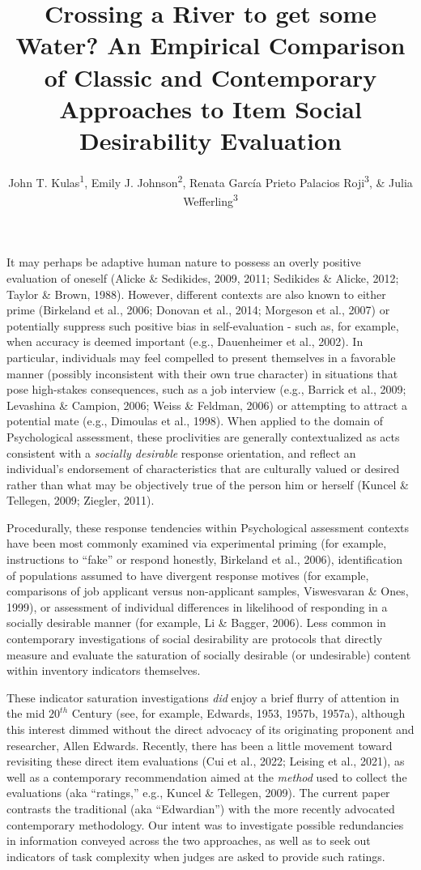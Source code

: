 \documentclass[
  ,jou]{apa6}
\title{Crossing a River to get some Water? An Empirical Comparison of Classic and Contemporary Approaches to Item Social Desirability Evaluation}
\author{John T. Kulas\textsuperscript{1}, Emily J. Johnson\textsuperscript{2}, Renata García Prieto Palacios Roji\textsuperscript{3}, \& Julia Wefferling\textsuperscript{3}}
\date{}
\affiliation{\vspace{0.5cm}\textsuperscript{1} eRg\\\textsuperscript{2} St.~Cloud State University\\\textsuperscript{3} Montclair State University}
\begin{document}
\maketitle

It may perhaps be adaptive human nature to possess an overly positive evaluation of oneself (Alicke \& Sedikides, 2009, 2011; Sedikides \& Alicke, 2012; Taylor \& Brown, 1988). However, different contexts are also known to either prime (Birkeland et al., 2006; Donovan et al., 2014; Morgeson et al., 2007) or potentially suppress such positive bias in self-evaluation - such as, for example, when accuracy is deemed important (e.g., Dauenheimer et al., 2002). In particular, individuals may feel compelled to present themselves in a favorable manner (possibly inconsistent with their own true character) in situations that pose high-stakes consequences, such as a job interview (e.g., Barrick et al., 2009; Levashina \& Campion, 2006; Weiss \& Feldman, 2006) or attempting to attract a potential mate (e.g., Dimoulas et al., 1998). When applied to the domain of Psychological assessment, these proclivities are generally contextualized as acts consistent with a \emph{socially desirable} response orientation, and reflect an individual's endorsement of characteristics that are culturally valued or desired rather than what may be objectively true of the person him or herself (Kuncel \& Tellegen, 2009; Ziegler, 2011).

Procedurally, these response tendencies within Psychological assessment contexts have been most commonly examined via experimental priming (for example, instructions to ``fake'' or respond honestly, Birkeland et al., 2006), identification of populations assumed to have divergent response motives (for example, comparisons of job applicant versus non-applicant samples, Viswesvaran \& Ones, 1999), or assessment of individual differences in likelihood of responding in a socially desirable manner (for example, Li \& Bagger, 2006). Less common in contemporary investigations of social desirability are protocols that directly measure and evaluate the saturation of socially desirable (or undesirable) content within inventory indicators themselves.

These indicator saturation investigations \emph{did} enjoy a brief flurry of attention in the mid \(20^{th}\) Century (see, for example, Edwards, 1953, 1957b, 1957a), although this interest dimmed without the direct advocacy of its originating proponent and researcher, Allen Edwards. Recently, there has been a little movement toward revisiting these direct item evaluations (Cui et al., 2022; Leising et al., 2021), as well as a contemporary recommendation aimed at the \emph{method} used to collect the evaluations (aka ``ratings,'' e.g., Kuncel \& Tellegen, 2009). The current paper contrasts the traditional (aka ``Edwardian'') with the more recently advocated contemporary methodology. Our intent was to investigate possible redundancies in information conveyed across the two approaches, as well as to seek out indicators of task complexity when judges are asked to provide such ratings.
\end{document}
